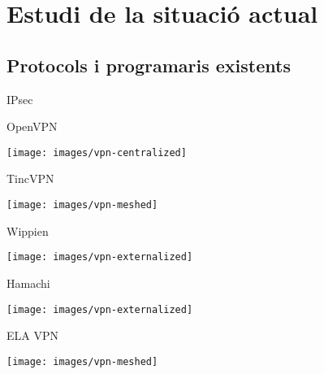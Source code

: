 \section{Estudi de la situació actual}
\subsection{Protocols i programaris existents}
    \begin{frame}{IPsec}
    \end{frame}
    \begin{frame}{OpenVPN}
        \begin{center}
        \texttt{[image: images/vpn-centralized]}
        \end{center}
    \end{frame}
    \begin{frame}{TincVPN}
        \begin{center}
        \texttt{[image: images/vpn-meshed]}
        \end{center}
    \end{frame}
    \begin{frame}{Wippien}
        \begin{center}
        \texttt{[image: images/vpn-externalized]}
        \end{center}
    \end{frame}
    \begin{frame}{Hamachi}
        \begin{center}
        \texttt{[image: images/vpn-externalized]}
        \end{center}
    \end{frame}
    \begin{frame}{ELA VPN}
        \begin{center}
        \texttt{[image: images/vpn-meshed]}
        \end{center}
    \end{frame}

